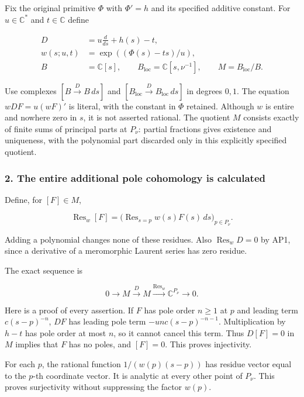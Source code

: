 \documentclass{article}
\begin{document}
Fix the original primitive \(\Phi\) with \(\Phi'=h\) and its specified additive constant. For \(u\in\mathbb{C}^{*}\) and \(t\in\mathbb{C}\) define

\[
\begin{aligned}
D&=u\frac{d}{ds}+h(s)-t,\\
w(s;u,t)&=\exp((\Phi(s)-t s)/u),\\
B&=\mathbb C[s],\qquad B_{\mathrm{loc}}=\mathbb C[s,\nu^{-1}],
\qquad M=B_{\mathrm{loc}}/B.
\end{aligned}
\tag{AP1}
\]

Use complexes \([B\xrightarrow{D}B\,ds]\) and \([B_{\mathrm{loc}}\xrightarrow{D}B_{\mathrm{loc}}\,ds]\) in degrees \(0,1\). The equation \(w D F = u (w F)'\) is literal, with the constant in \(\Phi\) retained. Although \(w\) is entire and nowhere zero in \(s\), it is not asserted rational. The quotient \(M\) consists exactly of finite sums of principal parts at \(P_{\nu}\): partial fractions gives existence and uniqueness, with the polynomial part discarded only in this explicitly specified quotient.

\subsubsection{2. The entire additional pole cohomology is calculated}\label{endpoint-analytic_pole--the-entire-additional-pole-cohomology-is-calculated}

Define, for \([F]\in M\),

\[
\operatorname{Res}_w[F]
=\bigl(\operatorname{Res}_{s=p}w(s)F(s)\,ds\bigr)_{p\in P_\nu}.
\tag{AP2}
\]

Adding a polynomial changes none of these residues. Also \(\operatorname{Res}_w D=0\) by AP1, since a derivative of a meromorphic Laurent series has zero residue.

The exact sequence is

\[
0\longrightarrow M\xrightarrow{D}M
\xrightarrow{\operatorname{Res}_w}\mathbb C^{P_\nu}\longrightarrow0.
\tag{AP3}
\]

Here is a proof of every assertion. If \(F\) has pole order \(n\geq1\) at \(p\) and leading term \(c(s-p)^{-n}\), \(D F\) has leading pole term \(-u n c(s-p)^{-n-1}\). Multiplication by \(h-t\) has pole order at most \(n\), so it cannot cancel this term. Thus \(D[F]=0\) in \(M\) implies that \(F\) has no poles, and \([F]=0\). This proves injectivity.

For each \(p\), the rational function \(1/(w(p)(s-p))\) has residue vector equal to the \(p\)-th coordinate vector. It is analytic at every other point of \(P_{\nu}\). This proves surjectivity without suppressing the factor \(w(p)\).
\end{document}
